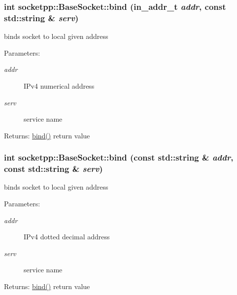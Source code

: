 \begin{CompactItemize}
{\subsubsection[{bind}]{\setlength{\rightskip}{0pt plus 5cm}int socketpp::BaseSocket::bind (in\_\-addr\_\-t {\em addr}, \/  const std::string \& {\em serv})}}
\label{classsocketpp_1_1BaseSocket_1b1249c5843a5d9205a6599670addf87}


binds socket to local given address 

\begin{Desc}
\item[Parameters:]
\begin{description}
\item[{\em addr}]IPv4 numerical address \item[{\em serv}]service name \end{description}
\end{Desc}
\begin{Desc}
\item[Returns:]\hyperlink{classsocketpp_1_1BaseSocket_78c2a8e6a5c7dfbc708c9cd637e88e51}{bind()} return value \end{Desc}
\hypertarget{classsocketpp_1_1BaseSocket_c82e79c07750af528b8bd705f0910e43}{
\subsubsection[{bind}]{\setlength{\rightskip}{0pt plus 5cm}int socketpp::BaseSocket::bind (const std::string \& {\em addr}, \/  const std::string \& {\em serv})}}
\label{classsocketpp_1_1BaseSocket_c82e79c07750af528b8bd705f0910e43}


binds socket to local given address 

\begin{Desc}
\item[Parameters:]
\begin{description}
\item[{\em addr}]IPv4 dotted decimal address \item[{\em serv}]service name \end{description}
\end{Desc}
\begin{Desc}
\item[Returns:]\hyperlink{classsocketpp_1_1BaseSocket_78c2a8e6a5c7dfbc708c9cd637e88e51}{bind()} return value \end{Desc}
\hypertarget{classsocketpp_1_1BaseSocket_d3df73f534900d40f9dff26171ec93b5}{
}
\end{CompactItemize}
